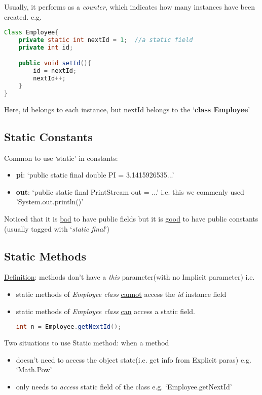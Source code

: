 \documentclass[12pt]{article}
\begin{document}
Usually, it performs as a \textit{counter}, which indicates how many instances have been created.\newline
e.g.
\begin{lstlisting}[language=Java]
Class Employee{
    private static int nextId = 1;  //a static field
    private int id; 

    public void setId(){
        id = nextId;
        nextId++;
    }
}
\end{lstlisting}

Here, id belongs to each instance, but nextId belongs to the `\textbf{class Employee}'

\subsection{Static Constants}
Common to use `static' in constants:
\begin{itemize}
    \item \textbf{pi}: `public static final double PI = 3.1415926535...'
    \item \textbf{out}: `public static final PrintStream out = ...' i.e. this we commenly used 'System.out.println()'
\end{itemize}

Noticed that it is \underline{bad} to have public fields but it is \underline{good} to have public constants (usually tagged with `\textit{static final}')

\subsection{Static Methods}
\underline{Definition}: methods don't have a \textit{this} parameter(with no Implicit parameter)\newline
i.e.
\begin{itemize}
    \item static methods of \textit{Employee class} \underline{cannot} access the \emph{id} instance field
    \item static methods of \textit{Employee class} \underline{can} access a static field.
    \begin{lstlisting}[language=Java]
    int n = Employee.getNextId();
    \end{lstlisting}
\end{itemize}

Two situations to use Static method: when a method
\begin{itemize}
    \item doesn't need to access the object state(i.e. get info from Explicit paras)\newline
    e.g. `Math.Pow'
    \item only needs to \textit{access} static field of the class\newline
    e.g. `Employee.getNextId'
\end{itemize}
\end{document}
